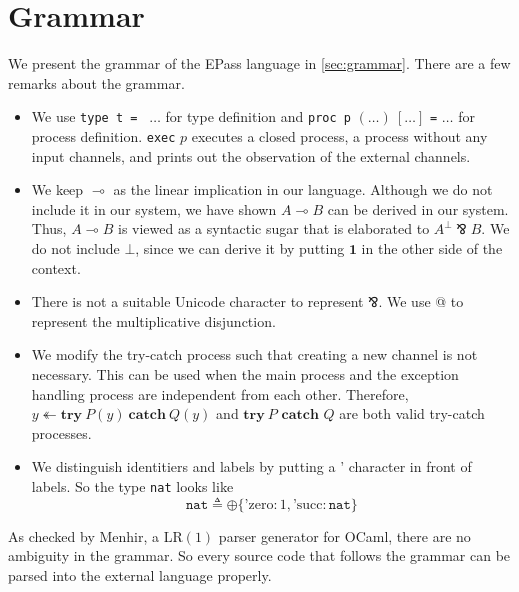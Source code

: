 \documentclass[12pt, openany]{memoir}
\newcommand*{\pare}[0]{\mathbin{\bindnasrepma}}
\newcommand*{\trycatch}[3]{#3 \twoheadleftarrow	\textbf{try}\ #1(#3)\ \textbf{catch}\ #2(#3)}
\begin{document}
\section{Grammar} 
We present the grammar of the EPass language in \cref{sec:grammar}. There are a few remarks about the grammar.
\begin{itemize}
  \item We use \texttt{type t = } $\ldots$ for type definition and \texttt{proc p} $(\ldots)\ [\ldots]$ \texttt{=} $\ldots$ for process definition.
  \texttt{exec} $p$ executes a closed process, a process without any input channels, and prints out the observation of the external channels. 
  \item We keep $\multimap$ as the linear implication in our language. Although we do not include it in our system, we have shown $A \multimap B$ can be derived in our system.
  Thus, $A \multimap B$ is viewed as a syntactic sugar that is elaborated to $A^\bot \pare B$.
  We do not include $\boldsymbol{\bot}$, since we can derive it by putting $\textbf{1}$ in the other side of the context.
  \item There is not a suitable Unicode character to represent $\pare$. We use @ to represent the multiplicative disjunction.
  \item We modify the try-catch process such that creating a new channel is not necessary. 
  This can be used when the main process and the exception handling process are independent from each other.
  Therefore, $\trycatch{P}{Q}{y}$ and $\textbf{try}\ P \textbf{ catch } Q$ are both valid try-catch processes.
  \item We distinguish identitiers and labels by putting a ' character in front of labels. So the type \texttt{nat} looks like
  \[
    \texttt{nat} \triangleq \oplus\{\text{'zero} : 1 , \text{'succ} : \texttt{nat}\}
  \]
\end{itemize}
As checked by Menhir, a LR$(1)$ parser generator for OCaml, there are no ambiguity in the grammar.
So every source code that follows the grammar can be parsed into the external language properly.
\end{document}
